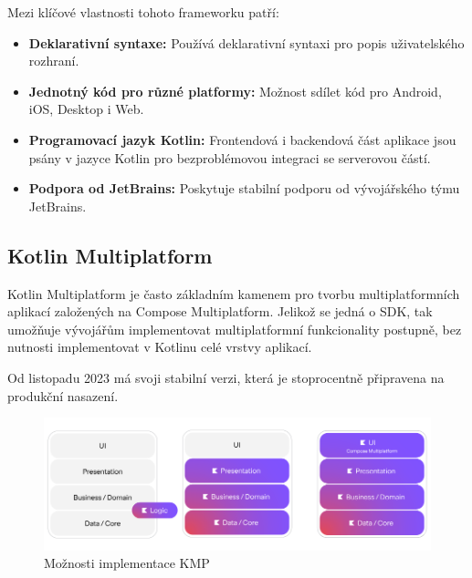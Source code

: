 \medskip

Mezi klíčové vlastnosti tohoto frameworku patří:

\begin{itemize}
    \item \textbf{Deklarativní syntaxe:} Používá deklarativní syntaxi pro popis uživatelského rozhraní.
    \item \textbf{Jednotný kód pro různé platformy:} Možnost sdílet kód pro Android, iOS, Desktop i Web.
    \item \textbf{Programovací jazyk Kotlin:} Frontendová i backendová část aplikace jsou psány v jazyce Kotlin pro bezproblémovou integraci se serverovou částí.
    \item \textbf{Podpora od JetBrains:} Poskytuje stabilní podporu od vývojářského týmu JetBrains.
\end{itemize}

\subsection{Kotlin Multiplatform}



Kotlin Multiplatform je často základním kamenem pro tvorbu multiplatformních aplikací založených na Compose Multiplatform. Jelikož se jedná o SDK, 
tak umožňuje vývojářům implementovat multiplatformní funkcionality postupně, bez nutnosti implementovat v Kotlinu celé vrstvy aplikací. 

Od listopadu 2023 má svoji stabilní verzi, která je stoprocentně připravena na produkční nasazení. \cite{KMPstable}

\begin{figure}[H]
  \centering
  \includegraphics[width=1\textwidth]{KMP_vrstvy.png}
  \caption{Možnosti implementace KMP}
  \label{fig:KMP_vrstvy}
\end{figure}



